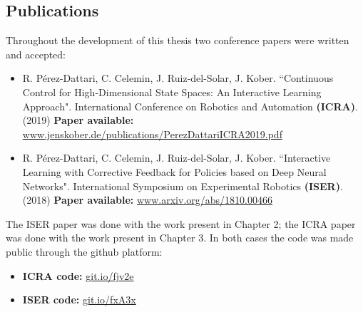 \begin{appendix2}
\section*{Publications}
Throughout the development of this thesis two conference papers were written and accepted:

\begin{itemize}
    \item R. Pérez-Dattari, C. Celemin, J. Ruiz-del-Solar, J. Kober. ``Continuous Control for High-Dimensional State Spaces: An Interactive Learning Approach". International Conference on Robotics and Automation \textbf{(ICRA)}. (2019)
    \newline\color{blue}\textbf{Paper available:} \color{black} \url{www.jenskober.de/publications/PerezDattariICRA2019.pdf}
    
    \vspace{0.5cm}
    
    \item R. Pérez-Dattari, C. Celemin, J. Ruiz-del-Solar, J. Kober. ``Interactive Learning with Corrective Feedback for Policies based on Deep Neural Networks". International Symposium on Experimental Robotics \textbf{(ISER)}. (2018)
    \newline\color{blue}\textbf{Paper available:} \color{black} \url{www.arxiv.org/abs/1810.00466}
\end{itemize}

The ISER paper was done with the work present in Chapter 2; the ICRA paper was done with the work present in Chapter 3. In both cases the code was made public through the github platform:

\begin{itemize}
    \item \textbf{ICRA code:} \url{git.io/fjv2e}
    
    \vspace{0.5cm}
    
    \item \textbf{ISER code:} \url{git.io/fxA3x}
\end{itemize}
\end{appendix2}